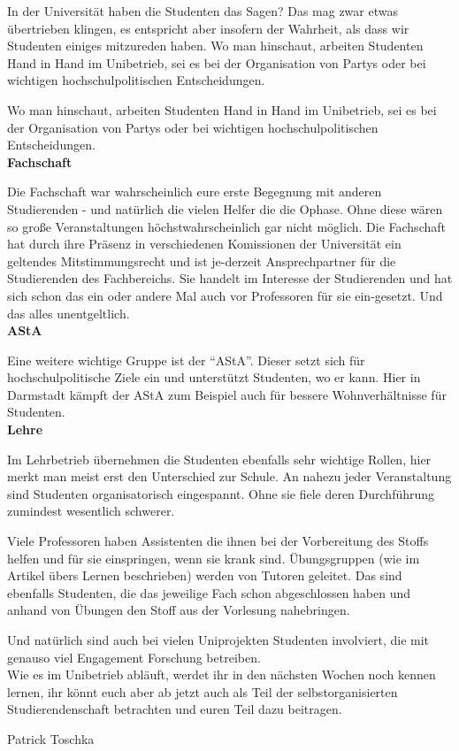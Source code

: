 {In der Universität haben die Studenten das Sagen? Das mag zwar etwas übertrieben klingen, es entspricht aber insofern der Wahrheit, als dass wir Studenten einiges mitzureden haben.
    Wo man hinschaut, arbeiten Studenten Hand in Hand im Unibetrieb, sei es bei der Organisation von Partys oder bei wichtigen hochschulpolitischen Entscheidungen.
}{
    Wo man hinschaut, arbeiten Studenten Hand in Hand im Unibetrieb, sei es bei der Organisation von Partys oder bei wichtigen hochschulpolitischen Entscheidungen.\\

    \textbf{Fachschaft}

    Die Fachschaft war wahrscheinlich eure erste Begegnung mit anderen Studierenden -  und natürlich die vielen Helfer die die Ophase. Ohne diese wären so große Veranstaltungen höchstwahrscheinlich gar nicht möglich. Die Fachschaft hat durch ihre Präsenz in verschiedenen Komissionen der Universität ein geltendes Mitstimmungsrecht und ist je-derzeit Ansprechpartner für die Studierenden des Fachbereichs. Sie handelt im Interesse der Studierenden und hat sich schon das ein oder andere Mal auch vor Professoren für sie ein-gesetzt. Und das alles unentgeltlich.\\

    \textbf{AStA}

    Eine weitere wichtige Gruppe ist der "`AStA"'. Dieser setzt sich für hochschulpolitische Ziele ein und unterstützt Studenten, wo er kann. Hier in Darmstadt kämpft der AStA zum Beispiel auch für bessere Wohnverhältnisse für Studenten.\\

    \textbf{Lehre}

    Im Lehrbetrieb übernehmen die Studenten ebenfalls sehr wichtige Rollen, hier merkt man meist erst den Unterschied zur Schule. An nahezu jeder Veranstaltung sind Studenten organisatorisch eingespannt. Ohne sie fiele deren Durchführung zumindest wesentlich schwerer.

    Viele Professoren haben Assistenten die ihnen bei der Vorbereitung des Stoffs helfen und für sie einspringen, wenn sie krank sind. Übungsgruppen (wie im Artikel übers Lernen beschrieben) werden von Tutoren geleitet. Das sind ebenfalls Studenten, die das jeweilige Fach schon abgeschlossen haben und anhand von Übungen den Stoff aus der Vorlesung nahebringen.

    Und natürlich sind auch bei vielen Uniprojekten Studenten involviert, die mit genauso viel Engagement Forschung betreiben.\\

    Wie es im Unibetrieb abläuft, werdet ihr in den nächsten Wochen noch kennen lernen, ihr könnt euch aber ab jetzt auch als Teil der selbstorganisierten Studierendenschaft betrachten und euren Teil dazu beitragen.
}
{Patrick Toschka}
\newpage
